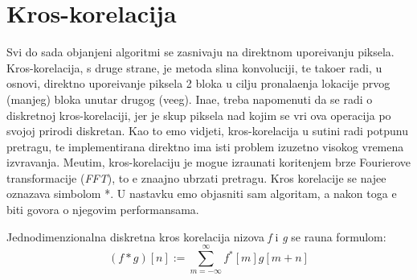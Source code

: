 \section{Kros-korelacija} %
Svi do sada obja\sh njeni algoritmi se zasnivaju na direktnom upore\dj ivanju piksela. Kros-korelacija, s druge strane, je metoda sli\ch na konvoluciji, te tako\dj er radi, u osnovi, direktno upore\dj ivanje piksela 2 bloka u
cilju pronala\zh enja lokacije prvog (manjeg) bloka unutar drugog (ve\cj eg). Ina\ch e, treba napomenuti da se radi o diskretnoj kros-korelaciji, jer je skup piksela nad kojim se vr\sh i ova operacija po svojoj prirodi
diskretan. Kao \sh to \cj emo vidjeti, kros-korelacija u su\sh tini radi potpunu pretragu, te implementirana direktno ima isti problem izuzetno visokog vremena izvr\sh avanja. Me\dj utim, kros-korelaciju je mogu\cj e
izra\ch unati kori\sh tenjem brze Fourierove transformacije (\textit{FFT}), \sh to \cj e zna\ch ajno ubrzati pretragu. Kros korelacije se naj\ch e\sh \cj e ozna\ch zava simbolom *. U nastavku \cj emo objasniti sam algoritam, 
a nakon toga \cj e biti govora o njegovim performansama.

Jednodimenzionalna diskretna kros korelacija nizova \textit{f} i \textit{g} se ra\ch una formulom: 
$$
(f * g) [n] := \sum_{m=-\infty}^{\infty}f^{*}[m]g[m+n]
$$